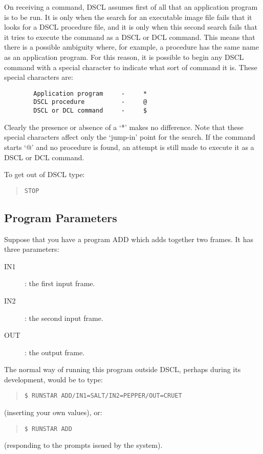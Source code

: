 On receiving a command, DSCL assumes first of all that an application program
is to be run.
It is only when the search for an executable image file fails that it looks for
a DSCL procedure file, and it is only when this second search fails that it
tries to execute the command as a DSCL or DCL command.
This means that there is a possible ambiguity where, for example, a
procedure has the same name as an application program.
For this reason, it is possible to begin any DSCL command with a special
character to indicate what sort of command it is.
These special characters are:
\begin{verbatim}
        Application program     -     *
        DSCL procedure          -     @
        DSCL or DCL command     -     $
\end{verbatim}
Clearly the presence or absence of a `*' makes no difference.
Note that these special characters affect only the `jump-in' point for the
search.
If the command starts `@' and no procedure is found, an attempt is still
made to execute it as a DSCL or DCL command.

To get out of DSCL type:
\begin{quote}
{\tt STOP}
\end{quote}
\subsection {Program Parameters}
Suppose that you have a program ADD which adds together two frames.
It has three parameters:
\begin{description}
\begin{description}
\item [IN1]: the first input frame.
\item [IN2]: the second input frame.
\item [OUT]: the output frame.
\end{description}
\end{description}
The normal way of running this program outside DSCL, perhaps during its
development, would be to type:
\begin{quote}
{\tt \$ RUNSTAR ADD/IN1=SALT/IN2=PEPPER/OUT=CRUET}
\end{quote}
(inserting your own values), or:
\begin{quote}
{\tt \$ RUNSTAR ADD}
\end{quote}
(responding to the prompts issued by the system).

